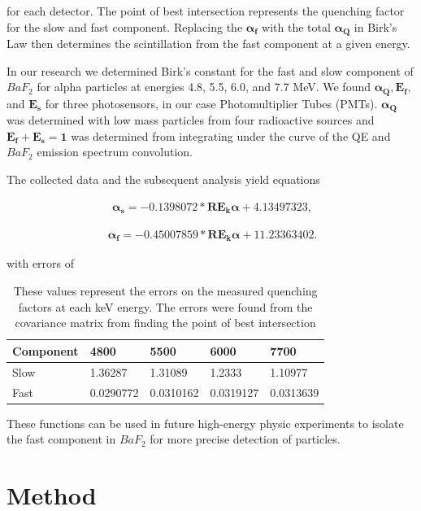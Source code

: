 \documentclass[aip, jmp, amsmath, amssymb, reprint, floatfix]{revtex4-1}
\begin{document}
for each detector. The point of best intersection represents the quenching factor for the slow and fast component. Replacing the $\bm{\alpha_f}$ with the total $\bm{\alpha_Q}$ in Birk's Law then determines the scintillation from the fast component at a given energy. 

In our research we determined Birk's constant for the fast and slow component of $BaF_2$ for alpha particles at energies 4.8, 5.5, 6.0, and 7.7 MeV. We found $\bm{\alpha_Q, E_f,}$ and $\bm{E_s}$ for three photosensors, in our case Photomultiplier Tubes (PMTs). $\bm{\alpha_Q}$ was determined with low mass particles from four radioactive sources and $\bm{E_f + E_s = 1}$ was determined from integrating under the curve of the QE and $BaF_2$ emission spectrum convolution. 

The collected data and the subsequent analysis yield equations 

\begin{eqnarray}
\ \bm{\alpha_s = -0.1398072 * RE_k\alpha + 4.13497323}
\label{eq:five},
\end{eqnarray}

\begin{eqnarray}
\ \bm{\alpha_f = -0.45007859 * RE_k\alpha + 11.23363402}
\label{eq:six}.
\end{eqnarray}

with errors of 

\begin{table}[h]
    \begin{tabular}{ | l | l | l | l | p{2cm} |}
    \hline
    Component & 4800 & 5500 & 6000 & 7700 \\ \hline

    Slow & 1.36287 & 1.31089 & 1.2333 & 1.10977\\ \hline  

    Fast & 0.0290772 & 0.0310162 & 0.0319127 & 0.0313639\\ \hline
    \hline
    \end{tabular}
  \caption{These values represent the errors on the measured quenching factors at each keV energy. The errors were found from the covariance matrix from finding the point of best intersection}
\end{table}


These functions can be used in future high-energy physic experiments to isolate the fast component in $BaF_2$ for more precise detection of particles. 


\section{\label{sec:level1}Method}
\end{document}
